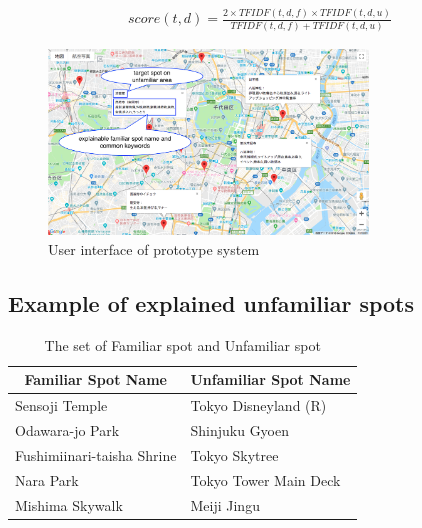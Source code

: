 \documentclass[journal]{IAENGtran}
\begin{document}
\begin{eqnarray}
  score(t,d) = \frac{2 \times TFIDF(t,d,f) \times TFIDF(t,d,u)}{TFIDF(t,d,f) + TFIDF(t,d,u)}
  \label{math:Harmonic Mean}
\end{eqnarray}

\begin{figure}[t]
  \begin{center}
    \includegraphics[clip,width=8.5cm,bb=0 0 1289 750]{picture/Photo_Map2_eng.png}
    \caption{User interface of prototype system}
    \label{fig:Photo_Map}
   \end{center}
\end{figure}

\subsection{Example of explained unfamiliar spots}
\label{subsec:Example of explained unfamiliar spots}

\begin{table}[t]
  \caption{The set of Familiar spot and Unfamiliar spot}
  \label{table:Familiar spot group and Unfamiliar spot group}
  \centering
  \begin{tabular}{l|l}
  \hline
  \multicolumn{1}{c|}{Familiar Spot Name} & \multicolumn{1}{c}{Unfamiliar Spot Name} \\ \hline
  Sensoji Temple                          & Tokyo Disneyland (R)                     \\
  Odawara-jo Park                         & Shinjuku Gyoen                           \\
  Fushimiinari-taisha Shrine              & Tokyo Skytree                            \\
  Nara Park                               & Tokyo Tower Main Deck            \\
  Mishima Skywalk                         & Meiji Jingu                              \\ \hline
  \end{tabular}
\end{table}
\end{document}
